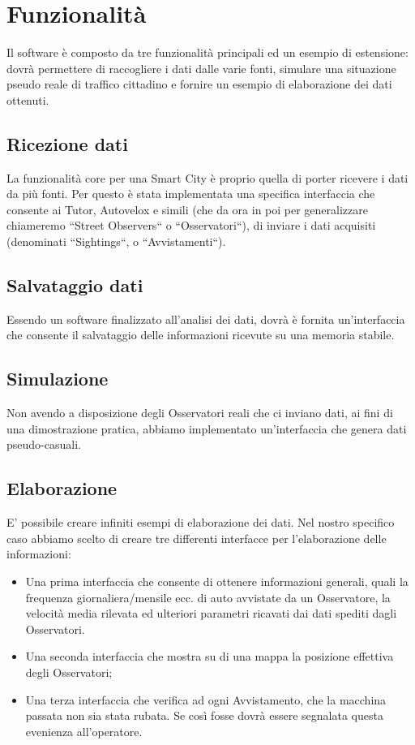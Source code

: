 \documentclass[a4paper,12pt]{report}
\begin{document}
\section{Funzionalità}

Il software è composto da tre funzionalità principali ed un esempio di 
estensione: dovrà permettere di raccogliere i dati dalle varie fonti, simulare 
una situazione pseudo reale di traffico cittadino e fornire un esempio di 
elaborazione dei dati ottenuti.

\subsection{Ricezione dati}
La funzionalità core per una Smart City è proprio quella di porter ricevere i 
dati da più fonti. Per questo è stata implementata una specifica interfaccia 
che consente ai Tutor, Autovelox e simili (che da ora in poi per generalizzare 
chiameremo ``Street Observers`` o ``Osservatori``), di inviare i dati acquisiti 
(denominati ``Sightings``, o ``Avvistamenti``).

\subsection{Salvataggio dati}
Essendo un software finalizzato all'analisi dei dati, dovrà è fornita 
un'interfaccia che consente il salvataggio delle informazioni ricevute su una 
memoria stabile.

\subsection{Simulazione}
Non avendo a disposizione degli Osservatori reali che ci inviano dati, 
ai fini di una dimostrazione pratica, abbiamo implementato un'interfaccia che 
genera dati pseudo-casuali. 

\subsection{Elaborazione}
E' possibile creare infiniti esempi di elaborazione dei dati. Nel nostro
specifico caso abbiamo scelto di creare tre differenti interfacce per 
l'elaborazione delle informazioni:
\begin{itemize}
  \item Una prima interfaccia che consente di ottenere informazioni generali, 
quali la frequenza giornaliera/mensile ecc. di auto avvistate da un 
Osservatore, la velocità media rilevata ed ulteriori parametri ricavati dai 
dati spediti dagli Osservatori.
  \item Una seconda interfaccia che mostra su di una mappa la posizione 
effettiva degli Osservatori;
  \item Una terza interfaccia che verifica ad ogni Avvistamento, che la 
macchina passata non sia stata rubata. Se così fosse dovrà essere segnalata 
questa evenienza all'operatore.
\end{itemize}
\end{document}
